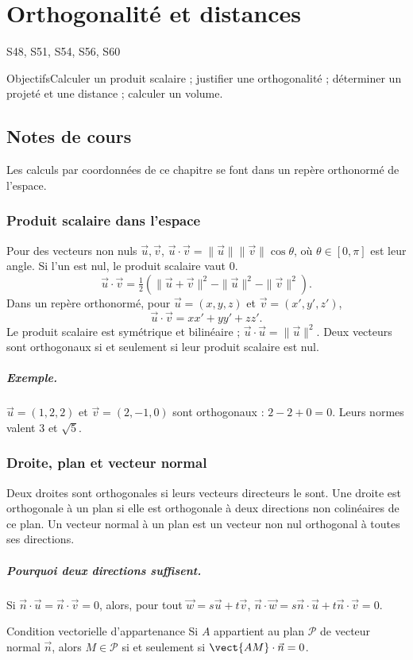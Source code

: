 \setcounter{chapter}{10}\chapter{Orthogonalité et distances}\label{ch:11}

{\small\sffamily\color{teal}S48, S51, S54, S56, S60\par}

\begin{retenir}{Objectifs}Calculer un produit scalaire ; justifier une orthogonalité ; déterminer un projeté et une distance ; calculer un volume.\end{retenir}

\section{Notes de cours}
Les calculs par coordonnées de ce chapitre se font dans un repère orthonormé de l'espace.
\subsection{Produit scalaire dans l'espace}
Pour des vecteurs non nuls $\vec u,\vec v$, $\vec u\cdot\vec v=\|\vec u\|\|\vec v\|\cos\theta$, où $\theta\in[0,\pi]$ est leur angle. Si l'un est nul, le produit scalaire vaut $0$.
\[\vec u\cdot\vec v=\tfrac12(\|\vec u+\vec v\|^2-\|\vec u\|^2-\|\vec v\|^2).
\]
Dans un repère orthonormé, pour $\vec u=(x,y,z)$ et $\vec v=(x',y',z')$,
\[\vec u\cdot\vec v=xx'+yy'+zz'.\]
Le produit scalaire est symétrique et bilinéaire ; $\vec u\cdot\vec u=\|\vec u\|^2$. Deux vecteurs sont orthogonaux si et seulement si leur produit scalaire est nul.
\paragraph{Exemple.} $\vec u=(1,2,2)$ et $\vec v=(2,-1,0)$ sont orthogonaux : $2-2+0=0$. Leurs normes valent $3$ et $\sqrt5$.
\subsection{Droite, plan et vecteur normal}
Deux droites sont orthogonales si leurs vecteurs directeurs le sont. Une droite est orthogonale à un plan si elle est orthogonale à deux directions non colinéaires de ce plan. Un vecteur normal à un plan est un vecteur non nul orthogonal à toutes ses directions.
\paragraph{Pourquoi deux directions suffisent.} Si $\vec n\cdot\vec u=\vec n\cdot\vec v=0$, alors, pour tout $\vec w=s\vec u+t\vec v$, $\vec n\cdot\vec w=s\vec n\cdot\vec u+t\vec n\cdot\vec v=0$.
\begin{retenir}{Condition vectorielle d'appartenance}
Si $A$ appartient au plan $\mathcal P$ de vecteur normal $\vec n$, alors $M\in\mathcal P$ si et seulement si $\vect{AM}\cdot\vec n=0$.
\end{retenir}
